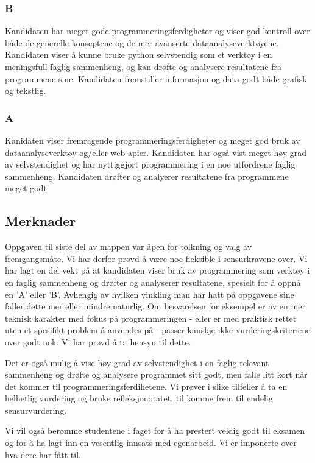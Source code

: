 \documentclass[12pt, titlepage]{article}
\begin{document}
\subsubsection*{B}
Kandidaten har meget gode programmeringsferdigheter og viser god kontroll over både de generelle konseptene og de mer avanserte dataanalyseverktøyene.
Kandidaten viser å kunne bruke python selvstendig som et verktøy i en meningsfull faglig sammenheng, og kan drøfte og analysere resultatene fra programmene sine.
Kandidaten fremstiller informasjon og data godt både grafisk og tekstlig.

\subsubsection*{A}
Kanidaten viser fremragende programmeringsferdigheter og meget god bruk av dataanalyseverktøy og/eller web-apier. 
Kandidaten har også vist meget høy grad av selvstendighet og har nyttiggjort programmering i en noe utfordrene faglig sammenheng.
Kandidaten drøfter og analyerer resultatene fra programmene meget godt.

\subsection*{Merknader}
Oppgaven til siste del av mappen var åpen for tolkning og valg av fremgangsmåte. Vi har derfor prøvd å være noe fleksible i sensurkravene over. 
Vi har lagt en del vekt på at kandidaten viser bruk av programmering som verktøy i en faglig sammenheng og drøfter og analyserer resultatene, spesielt
for å oppnå en 'A' eller 'B'. Avhengig av hvilken vinkling man har hatt på oppgavene sine faller dette mer eller mindre naturlig. Om besvarelsen for eksempel er
av en mer teknisk karakter med fokus på programmeringen - eller er med praktisk rettet uten et spesifikt problem å anvendes på - passer kanskje ikke vurderingskriteriene over godt nok.
Vi har prøvd å ta hensyn til dette.

Det er også mulig å vise høy grad av selvstendighet i en faglig relevant sammenheng og drøfte og analysere programmet sitt godt, men falle litt kort når det kommer til programmeringsferdihetene.
Vi prøver i slike tilfeller å ta en helhetlig vurdering og bruke refleksjonotatet, til komme frem til endelig sensurvurdering.

Vi vil også berømme studentene i faget for å ha prestert veldig godt til eksamen og for å ha lagt inn en vesentlig innsats med egenarbeid. Vi er imponerte over hva dere har fått til.
\end{document}
